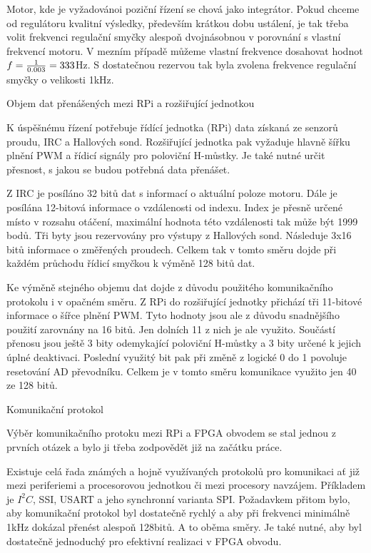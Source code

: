  Motor, kde je vyžadovánoi poziční řízení se chová jako integrátor. Pokud chceme od regulátoru kvalitní výsledky, především krátkou dobu ustálení, je tak třeba volit frekvenci regulační smyčky alespoň dvojnásobnou v porovnání s vlastní frekvencí motoru. V mezním případě můžeme vlastní frekvence dosahovat hodnot $f={{1}\over{0.003}}=333$Hz. S dostatečnou rezervou tak byla zvolena frekvence regulační smyčky o velikosti 1kHz.
 
 \sec Objem dat přenášených mezi RPi a rozšiřující jednotkou
 
 K úspěšnému řízení potřebuje řídící jednotka (RPi) data získaná ze senzorů proudu, IRC a Hallových sond. Rozšiřující jednotka pak vyžaduje hlavně šířku plnění PWM a řídicí signály pro poloviční H-můstky. Je také nutné určit přesnost, s jakou se budou potřebná data přenášet. 
 
 Z IRC je posíláno 32 bitů dat s informací o aktuální poloze motoru. Dále je posílána 12-bitová informace o vzdálenosti od indexu. Index je přesně určené místo v rozsahu otáčení, maximální hodnota této vzdálenosti tak může být 1999 bodů. Tři byty jsou rezervovány pro výstupy z Hallových sond. Následuje 3x16 bitů informace o změřených proudech. Celkem tak v tomto směru dojde při každém průchodu řídicí smyčkou k výměně 128 bitů dat.
 
 Ke výměně stejného objemu dat dojde z důvodu použitého komunikačního protokolu i v opačném směru. Z RPi do rozšiřující jednotky přichází tři 11-bitové informace o šířce plnění PWM. Tyto hodnoty jsou ale z důvodu snadnějšího použití zarovnány na 16 bitů. Jen dolních 11 z nich je ale využito. Součástí přenosu jsou ještě 3 bity odemykající poloviční H-můstky a 3 bity určené k jejich úplné deaktivaci. Poslední využitý bit pak při změně z logické 0 do 1 povoluje resetování AD převodníku. Celkem je v tomto směru komunikace využito jen 40 ze 128 bitů.
 
 
 \sec Komunikační protokol
 
 Výběr komunikačního protoku mezi RPi a FPGA obvodem se stal jednou z prvních otázek a bylo ji třeba zodpovědět již na začátku práce. 
 
 Existuje celá řada známých a hojně využívaných protokolů pro komunikaci ať již mezi periferiemi a procesorovou jednotkou či mezi procesory navzájem. Příkladem je $I^2C$, SSI, USART a jeho synchronní varianta SPI. Požadavkem přitom bylo, aby komunikační protokol byl dostatečně rychlý a aby při frekvenci minimálně 1kHz dokázal přenést alespoň 128bitů. A to oběma směry. Je také nutné, aby byl dostatečně jednoduchý pro efektivní realizaci v FPGA obvodu.
 
